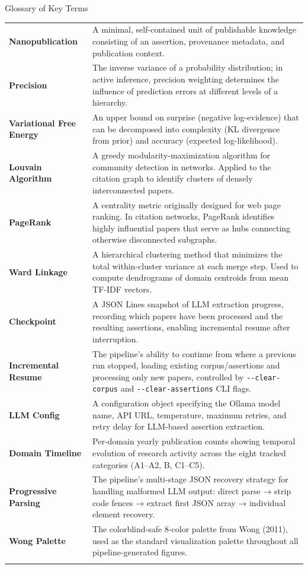\documentclass[
  ignorenonframetext,
]{beamer}
\begin{document}
\begin{frame}[fragile]{Glossary of Key Terms}
{\begin{longtable}[]{@{}
  >{\raggedright\arraybackslash}p{}
  >{\raggedright\arraybackslash}p{}@{}}
\textbf{Nanopublication} & A minimal, self-contained unit of publishable
knowledge consisting of an assertion, provenance metadata, and
publication context. \\
\textbf{Precision} & The inverse variance of a probability distribution;
in active inference, precision weighting determines the influence of
prediction errors at different levels of a hierarchy. \\
\textbf{Variational Free Energy} & An upper bound on surprise (negative
log-evidence) that can be decomposed into complexity (KL divergence from
prior) and accuracy (expected log-likelihood). \\
\textbf{Louvain Algorithm} & A greedy modularity-maximization algorithm
for community detection in networks. Applied to the citation graph to
identify clusters of densely interconnected papers. \\
\textbf{PageRank} & A centrality metric originally designed for web page
ranking. In citation networks, PageRank identifies highly influential
papers that serve as hubs connecting otherwise disconnected
subgraphs. \\
\textbf{Ward Linkage} & A hierarchical clustering method that minimizes
the total within-cluster variance at each merge step. Used to compute
dendrograms of domain centroids from mean TF-IDF vectors. \\
\textbf{Checkpoint} & A JSON Lines snapshot of LLM extraction progress,
recording which papers have been processed and the resulting assertions,
enabling incremental resume after interruption. \\
\textbf{Incremental Resume} & The pipeline's ability to continue from
where a previous run stopped, loading existing corpus/assertions and
processing only new papers, controlled by \texttt{-\/-clear-corpus} and
\texttt{-\/-clear-assertions} CLI flags. \\
\textbf{LLM Config} & A configuration object specifying the Ollama model
name, API URL, temperature, maximum retries, and retry delay for
LLM-based assertion extraction. \\
\textbf{Domain Timeline} & Per-domain yearly publication counts showing
temporal evolution of research activity across the eight tracked
categories (A1--A2, B, C1--C5). \\
\textbf{Progressive Parsing} & The pipeline's multi-stage JSON recovery
strategy for handling malformed LLM output: direct parse → strip code
fences → extract first JSON array → individual element recovery. \\
\textbf{Wong Palette} & The colorblind-safe 8-color palette from Wong
(2011), used as the standard visualization palette throughout all
pipeline-generated figures. \\
\bottomrule\noalign{}
\end{longtable}
}
\end{frame}
\end{document}

